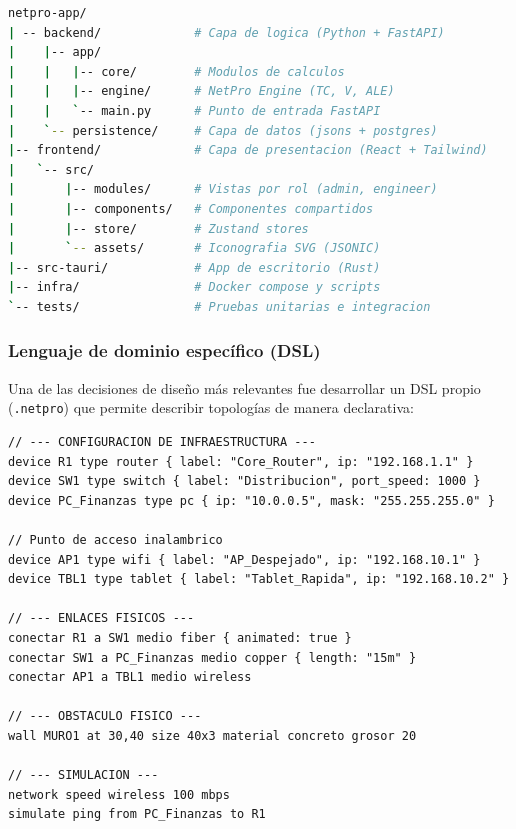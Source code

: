 \documentclass[11pt,letterpaper,oneside]{article}
\begin{document}
\begin{lstlisting}[language=bash,caption={Estructura de carpetas del repositorio},captionpos=b]
netpro-app/
| -- backend/             # Capa de logica (Python + FastAPI)
|    |-- app/
|    |   |-- core/        # Modulos de calculos
|    |   |-- engine/      # NetPro Engine (TC, V, ALE)
|    |   `-- main.py      # Punto de entrada FastAPI
|    `-- persistence/     # Capa de datos (jsons + postgres)
|-- frontend/             # Capa de presentacion (React + Tailwind)
|   `-- src/
|       |-- modules/      # Vistas por rol (admin, engineer)
|       |-- components/   # Componentes compartidos
|       |-- store/        # Zustand stores
|       `-- assets/       # Iconografia SVG (JSONIC)
|-- src-tauri/            # App de escritorio (Rust)
|-- infra/                # Docker compose y scripts
`-- tests/                # Pruebas unitarias e integracion
\end{lstlisting}

\subsubsection{Lenguaje de dominio específico (DSL)}

Una de las decisiones de diseño más relevantes fue desarrollar un DSL propio (\texttt{.netpro}) que permite describir topologías de manera declarativa:

\begin{lstlisting}[language=netpro,caption={Ejemplo de código \texttt{.netpro}: topología completa con simulación},captionpos=b]
// --- CONFIGURACION DE INFRAESTRUCTURA ---
device R1 type router { label: "Core_Router", ip: "192.168.1.1" }
device SW1 type switch { label: "Distribucion", port_speed: 1000 }
device PC_Finanzas type pc { ip: "10.0.0.5", mask: "255.255.255.0" }

// Punto de acceso inalambrico
device AP1 type wifi { label: "AP_Despejado", ip: "192.168.10.1" }
device TBL1 type tablet { label: "Tablet_Rapida", ip: "192.168.10.2" }

// --- ENLACES FISICOS ---
conectar R1 a SW1 medio fiber { animated: true }
conectar SW1 a PC_Finanzas medio copper { length: "15m" }
conectar AP1 a TBL1 medio wireless

// --- OBSTACULO FISICO ---
wall MURO1 at 30,40 size 40x3 material concreto grosor 20

// --- SIMULACION ---
network speed wireless 100 mbps
simulate ping from PC_Finanzas to R1
\end{lstlisting}
\end{document}
